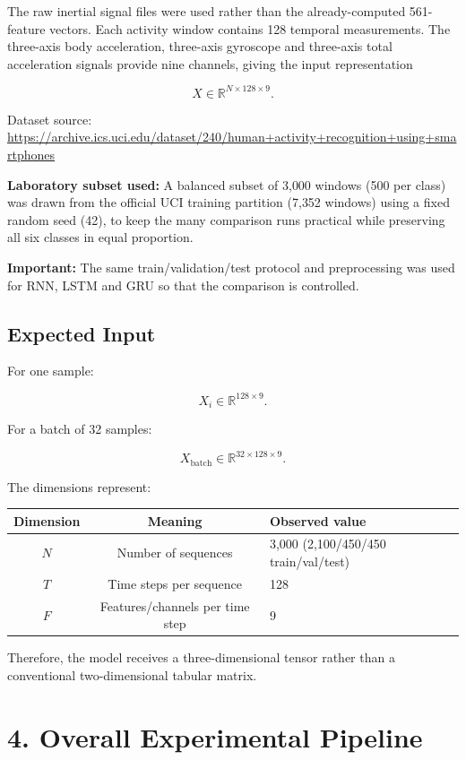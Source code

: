 \documentclass[10pt]{article}
\begin{document}
The raw inertial signal files were used rather than the already-computed
561-feature vectors. Each activity window contains 128 temporal measurements.
The three-axis body acceleration, three-axis gyroscope and three-axis total
acceleration signals provide nine channels, giving the input representation

\[
X\in\mathbb{R}^{N\times128\times9}.
\]

Dataset source:
\url{https://archive.ics.uci.edu/dataset/240/human+activity+recognition+using+smartphones}

\textbf{Laboratory subset used:} A balanced subset of 3{,}000 windows (500
per class) was drawn from the official UCI training partition
(7{,}352 windows) using a fixed random seed (42), to keep the many
comparison runs practical while preserving all six classes in equal
proportion.

\textbf{Important:} The same train/validation/test protocol and
preprocessing was used for RNN, LSTM and GRU so that the comparison is
controlled.

\subsection*{Expected Input}

For one sample:

\[
X_i\in\mathbb{R}^{128\times9}.
\]

For a batch of 32 samples:

\[
X_{\mathrm{batch}}\in\mathbb{R}^{32\times128\times9}.
\]

The dimensions represent:

\begin{center}
\begin{tabular}{|c|c|l|}
\hline
Dimension & Meaning & Observed value\\
\hline
$N$ & Number of sequences & 3{,}000 (2{,}100/450/450 train/val/test)\\
$T$ & Time steps per sequence & 128\\
$F$ & Features/channels per time step & 9\\
\hline
\end{tabular}
\end{center}

Therefore, the model receives a three-dimensional tensor rather than a
conventional two-dimensional tabular matrix.

\section*{4. Overall Experimental Pipeline}
\end{document}

